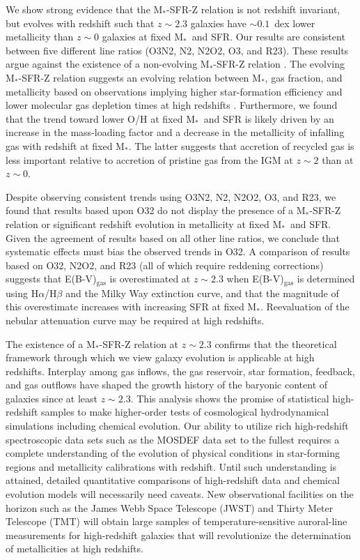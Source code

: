 \documentclass[iop,twocolappendix]{emulateapj}
\newcommand{\mstar}{$\mbox{M}_*$}
\begin{document}
We show strong evidence that the \mstar-SFR-Z relation is not redshift invariant, but evolves
 with redshift such that $z\sim2.3$ galaxies have $\sim0.1$~dex lower metallicity than
 $z\sim0$ galaxies at fixed \mstar\ and SFR.  Our results are consistent between five different
 line ratios (O3N2, N2, N2O2, O3, and R23).  These results argue against the existence of a
 non-evolving \mstar-SFR-Z relation \citep{man10}.
  The evolving \mstar-SFR-Z relation suggests an evolving relation between \mstar, gas fraction, and metallicity
 based on observations implying higher star-formation efficiency and lower molecular gas depletion times
 at high redshifts \citep{tac13,gen15,sco16,sco17}.
  Furthermore, we found that the trend toward lower O/H at fixed \mstar\ and SFR is likely driven by
 an increase in the mass-loading factor and a decrease in the metallicity of infalling gas with redshift
 at fixed \mstar.  The latter suggests that accretion of recycled gas is less important relative to
 accretion of pristine gas from the IGM at $z\sim2$ than at $z\sim0$.

Despite observing consistent trends using O3N2, N2, N2O2, O3, and R23, we found that results
 based upon O32 do not display the presence of a \mstar-SFR-Z relation or significant
 redshift evolution in metallicity at fixed \mstar\ and SFR.  Given the agreement of results
 based on all other line ratios, we conclude that systematic effects must bias the observed trends in O32.
  A comparison of results based on O32, N2O2, and R23 (all of which require reddening corrections)
 suggests that E(B-V)$_{\text{gas}}$ is overestimated at $z\sim2.3$ when E(B-V)$_{\text{gas}}$
 is determined using H$\alpha$/H$\beta$ and the \citet{car89} Milky Way extinction curve,
 and that the magnitude of this overestimate increases with increasing SFR at fixed \mstar.
  Reevaluation of the nebular attenuation curve may be required at high redshifts.

The existence of a \mstar-SFR-Z relation at $z\sim2.3$ confirms that the theoretical
 framework through which we view galaxy evolution is applicable at high redshifts.
  Interplay among gas inflows, the gas reservoir, star formation, feedback, and
 gas outflows have shaped the growth history of the baryonic content of galaxies since
 at least $z\sim2.3$.
  This analysis shows the promise of statistical high-redshift samples to make higher-order
 tests of cosmological hydrodynamical simulations including chemical evolution.
  Our ability to utilize rich high-redshift spectroscopic data sets such as the MOSDEF
 data set to the fullest requires a complete understanding of the evolution of physical
 conditions in star-forming regions and metallicity calibrations with redshift.
  Until such understanding is attained, detailed quantitative comparisons of high-redshift
 data and chemical evolution models will necessarily need caveats.
  New observational facilities on the horizon such as the James Webb Space Telescope
 (JWST) and Thirty Meter Telescope (TMT) will obtain large samples of temperature-sensitive
 auroral-line measurements for high-redshift galaxies that will revolutionize the determination
 of metallicities at high redshifts.
\end{document}
